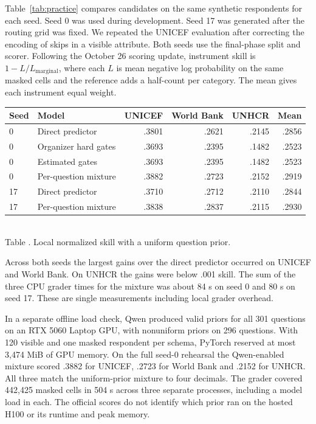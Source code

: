 Table~\ref{tab:practice} compares candidates on the same synthetic respondents
for each seed. Seed 0 was used during development. Seed 17 was generated after
the routing grid was fixed. We repeated the UNICEF evaluation after correcting
the encoding of skips in a visible attribute. Both seeds use the final-phase split
and scorer. Following the October 26 scoring update, instrument skill is
$1-L/L_{\mathrm{marginal}}$, where each $L$ is mean negative log probability
on the same masked cells and the reference adds a half-count per category.
The mean gives each instrument equal weight.
\begin{center}\small
\begin{tabular}{@{}llrrrr@{}}
\toprule
Seed & Model & UNICEF & World Bank & UNHCR & Mean\\\midrule
0 & Direct predictor & .3801 & .2621 & .2145 & .2856\\
0 & Organizer hard gates & .3693 & .2395 & .1482 & .2523\\
0 & Estimated gates & .3693 & .2395 & .1482 & .2523\\
0 & Per-question mixture & .3882 & .2723 & .2152 & .2919\\\midrule
17 & Direct predictor & .3710 & .2712 & .2110 & .2844\\
17 & Per-question mixture & .3838 & .2837 & .2115 & .2930\\
\bottomrule
\end{tabular}
\label{tab:practice}\\[3pt]
Table \thetable. Local normalized skill with a uniform question prior.
\end{center}
Across both seeds the largest gains over the direct predictor occurred on
UNICEF and World Bank. On UNHCR the gains were below .001 skill. The sum of
the three CPU grader times for the mixture was about 84 s on seed 0 and 80 s
on seed 17. These are single measurements including local grader overhead.

In a separate offline load check, Qwen produced valid priors for all 301
questions on an RTX 5060 Laptop GPU, with nonuniform priors on 296 questions.
With 120 visible and one masked respondent per schema, PyTorch reserved at
most 3,474 MiB of GPU memory. On the full seed-0 rehearsal the Qwen-enabled
mixture scored .3882 for UNICEF, .2723 for World Bank and .2152 for UNHCR.
All three match the uniform-prior mixture to four decimals. The grader
covered 442,425 masked cells in 504 s across three separate processes,
including a model load in each. The official scores do not identify which
prior ran on the hosted H100 or its runtime and peak memory.
